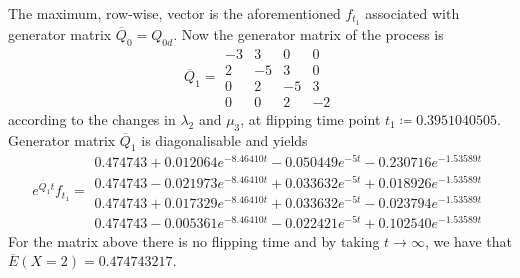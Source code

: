 \documentclass{article}
\begin{document}
The maximum, row-wise, vector is the aforementioned $f_{t_1}$ associated with generator matrix $\overline{Q}_{0}=Q_{0d}$.
Now the generator matrix of the process is
\begin{equation*} 
 \overline{Q}_{1}= 
 \begin{array}{|rrrr|}
  -3 & 3 & 0 & 0 \\
  2 & -5 & 3 & 0 \\
  0 & 2 & -5 & 3 \\
  0 & 0 & 2 & -2 
 \end{array}
 \end{equation*}
according to the changes in $\lambda_{2}$ and $\mu_{3}$, at flipping time point $t_{1}\coloneqq 0.3951040505$.
Generator matrix $\overline{Q}_1$ is diagonalisable and yields 
\begin{equation*} 
 e^{\overline{Q}_{1}t}f_{t_1}= 
 \begin{array}{|r|}
 0.474743+0.012064e^{-8.46410t}-0.050449e^{-5t}-0.230716e^{-1.53589t}\\
 0.474743-0.021973e^{-8.46410t}+0.033632e^{-5t}+0.018926e^{-1.53589t}\\
 0.474743+0.017329e^{-8.46410t}+0.033632e^{-5t}-0.023794e^{-1.53589t}\\
 0.474743-0.005361e^{-8.46410t}-0.022421e^{-5t}+0.102540e^{-1.53589t}  
 \end{array}
 \end{equation*}
For the matrix above there is no flipping time and by taking $t\to\infty$, we have that
$\overline{E}(X=2) = 0.474743217$.\\\\\\



\end{document}
